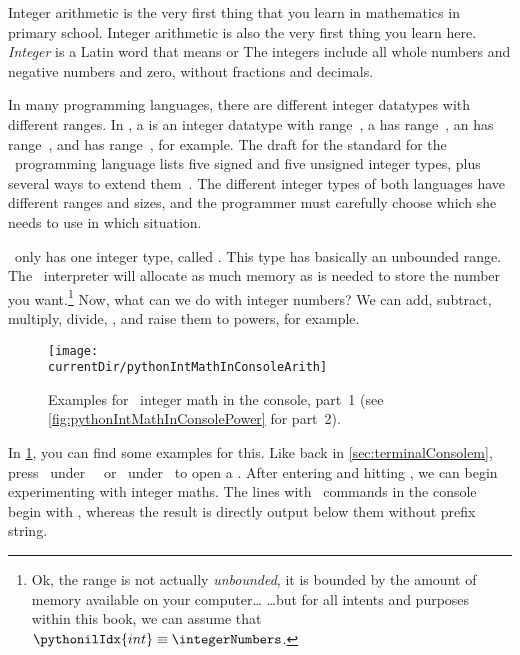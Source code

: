 %
\label{sec:int}%
%
Integer arithmetic is the very first thing that you learn in mathematics in primary school.
Integer arithmetic is also the very first thing you learn here.
\emph{Integer} is a Latin word that means  or 
The integers include all whole numbers and negative numbers and zero, without fractions and decimals.

In many programming languages, there are different integer datatypes with different ranges.
In , a  is an integer datatype with range~, a  has range~, an  has range~, and  has range~, for example.
The draft for the  standard for the ~programming language lists five signed and five unsigned integer types, plus several ways to extend them~\cite{ISOIEC98892017PLCWDOS}.
The different integer types of both languages have different ranges and sizes, and the programmer must carefully choose which she needs to use in which situation.

\python\ only has one integer type, called .
This type has basically an unbounded range.
The \python\ interpreter will allocate as much memory as is needed to store the number you want.\footnote{%
Ok, the range is not actually \emph{unbounded}, it is bounded by the amount of memory available on your computer{\dots} {\dots}but for all intents and purposes within this book, we can assume that~$\pythonilIdx{int}\equiv\integerNumbers$.}%
%
%
Now, what can we do with integer numbers?
We can add, subtract, multiply, divide, , and raise them to powers, for example.

\begin{figure}%
\centering%
\texttt{[image: \\currentDir/pythonIntMathInConsoleArith]}%
\caption{Examples for \python\ integer math in the console, part~1 (see \cref{fig:pythonIntMathInConsolePower} for part~2).}%
\label{fig:pythonIntMathInConsoleArith}%
\end{figure}%

In \cref{fig:pythonIntMathInConsoleArith}, you can find some examples for this.
Like back in \cref{sec:terminalConsolem}, press \ubuntuTerminal\ under \ubuntu\ \linux\ or \windowsTerminal\ under \windows\ to open a .
After entering  and hitting \keys{\enter}, we can begin experimenting with integer maths.
The lines with \python\ commands in the console begin with \pythonil{>>>}, whereas the result is directly output below them without prefix string.

